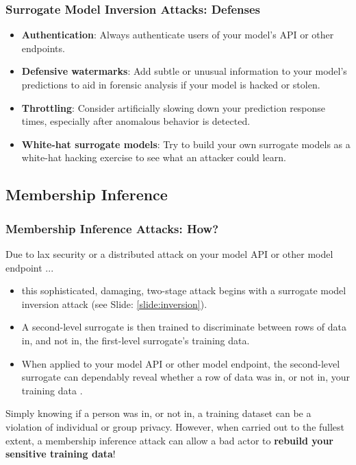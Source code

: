 \documentclass[11pt,
               aspectratio=169,
               hyperref={colorlinks}
               ]{beamer}
\begin{document}
			\begin{frame}[label={slide:inversion_defense}]
		
				\frametitle{Surrogate Model Inversion Attacks: \textbf{Defenses}}
				\begin{itemize}
					\item \textbf{Authentication}: Always authenticate users of your model’s API or other endpoints.
					\item \textbf{Defensive watermarks}: Add subtle or unusual information to your model’s predictions to aid in forensic analysis if your model is hacked or stolen.
					\item \textbf{Throttling}: Consider artificially slowing down your prediction response times, especially after anomalous behavior is detected.
					\item \textbf{White-hat surrogate models}: Try to build your own surrogate models as a white-hat hacking exercise to see what an attacker could learn.
				\end{itemize}
				
			\end{frame}
		

		\subsection{Membership Inference}

			\begin{frame}
		
				\frametitle{Membership Inference Attacks: \textbf{How?}}		
				\small Due to lax security or a distributed attack on your model API or other model endpoint ... 
			
				\begin{itemize}
					\item this sophisticated, damaging, two-stage attack begins with a surrogate model inversion attack (see Slide: \ref{slide:inversion}).
					\item A second-level surrogate is then trained to discriminate between rows of data in, and not in, the first-level surrogate's training data.
					\item When applied to your model API or other model endpoint, the second-level surrogate can dependably reveal whether a row of data was in, or not in, your training data \cite{membership_inference}.
				\end{itemize}
				
Simply knowing if a person was in, or not in, a training dataset can be a violation of individual or group privacy. However, when carried out to the fullest extent, a membership inference attack can allow a bad actor to \textbf{rebuild your sensitive training data}!\normalsize	

			\end{frame}
	
\end{document}
